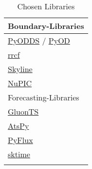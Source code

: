 \begin{table}[h]\centering
        \begin{tabular}{l}
            Boundary-Libraries \\\midrule
            \href{https://github.com/datamllab/pyodds}{PyODDS} / \href{https://github.com/yzhao062/pyod}{PyOD}      \\\addlinespace
            \href{https://github.com/kLabUM/rrcf}{rrcf}                                                             \\\addlinespace
            \href{https://github.com/earthgecko/skyline}{Skyline}                                                   \\\addlinespace
            \href{https://github.com/htm-community/htm.core}{NuPIC}                                                 \\\addlinespace\addlinespace
            Forecasting-Libraries \\\midrule
            \href{https://github.com/awslabs/gluon-ts}{GluonTS}                                                     \\\addlinespace
            \href{https://github.com/firmai/atspy}{AtsPy}                                                           \\\addlinespace
            \href{https://github.com/RJT1990/pyflux}{PyFlux}                                                        \\\addlinespace
            \href{https://github.com/alan-turing-institute/sktime}{sktime}                                          \\\addlinespace
        \end{tabular}
    \caption{Chosen Libraries}\label{tab:chosen-packages}
\end{table}

